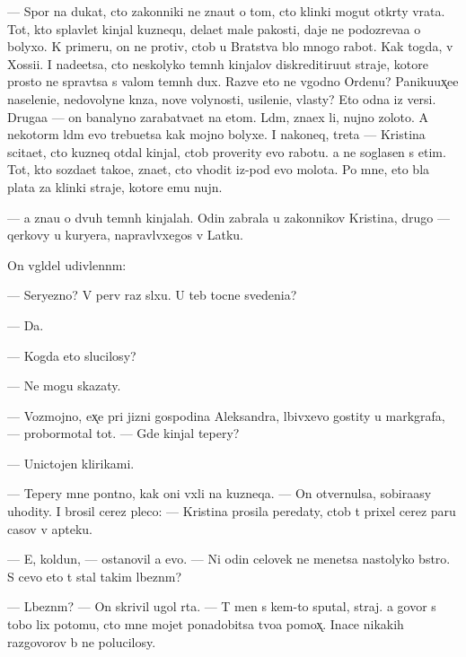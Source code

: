 \documentclass[10pt]{book}
\begin{document}
— Spor{\iu} na dukat, cto zakonniki ne zna{\y}ut o tom, cto klinki mogut otkr{\yi}ty vrata. Tot, kto splavl{\ia}{\y}et kinjal{\yi} kuznequ, dela{\y}et mal{\yi}{\y}e pakosti, daje ne podozreva{\y}a o bolyxo{\y}. K primeru, on ne protiv, ctob{\yi} u Bratstva b{\yi}lo mnogo rabot{\yi}. Kak togda, v Xossi{\y}i. I nade{\y}etsa, cto neskolyko temn{\yi}h kinjalov diskreditiru{\y}ut straje{\y}, kotor{\yi}{\y}e prosto ne sprav{\ia}tsa s valom temn{\yi}h dux. Razve eto ne v{\yi}godno Ordenu? Paniku{\y}ux̨e{\y}e naseleni{\y}e, nedovolyn{\yi}{\y}e kn{\ia}z{\y}a, nov{\yi}{\y}e volynosti, usileni{\y}e, vlasty? Eto odna iz versi{\y}. Druga{\y}a — on banalyno zarabat{\yi}va{\y}et na etom. L{\iu}d{\ia}m, zna{\y}ex li, nujno zoloto. A nekotor{\yi}m l{\iu}d{\ia}m {\y}evo trebu{\y}etsa kak mojno bolyxe. I nakoneq, tret{\y}a — Kristina scita{\y}et, cto kuzneq otdal kinjal, ctob{\yi} proverity {\y}evo rabotu. {\Y}a ne soglasen s etim. Tot, kto sozda{\y}et tako{\y}e, zna{\y}et, cto v{\yi}hodit iz-pod {\y}evo molota. Po mne, eto b{\yi}la plata za klinki straje{\y}, kotor{\yi}{\y}e {\y}emu nujn{\yi}.

— {\Y}a zna{\y}u o dvuh temn{\yi}h kinjalah. Odin zabrala u zakonnikov Kristina, drugo{\y} — qerkovy u kuryera, napravl{\ia}vxegos{\ia} v Latku.

On v{\yi}gl{\ia}del udivlenn{\yi}m:

— Seryezno? V perv{\yi}{\y} raz sl{\yi}xu. U teb{\ia} tocn{\yi}{\y}e svedeni{\y}a?

— Da.

— Kogda eto slucilosy?

— Ne mogu skazaty.

— Vozmojno, {\y}ex̨e pri jizni gospodina Aleksandra, l{\iu}bivxevo gostity u markgrafa, — probormotal tot. — Gde kinjal tepery?

— Unictojen klirikami.

— Tepery mne pon{\ia}tno, kak oni v{\yi}xli na kuzneqa. — On otvernulsa, sobira{\y}asy uhodity. I brosil cerez pleco: — Kristina prosila peredaty, ctob{\yi} t{\yi} prixel cerez paru casov v apteku.

— E{\y}, koldun, — ostanovil {\y}a {\y}evo. — Ni odin celovek ne men{\ia}{\y}etsa nastolyko b{\yi}stro. S cevo eto t{\yi} stal takim l{\iu}bezn{\yi}m?

— L{\iu}bezn{\yi}m? — On skrivil ugol rta. — T{\yi} men{\ia} s kem-to sputal, straj. {\Y}a govor{\iu} s tobo{\y} lix potomu, cto mne mojet ponadobitsa tvo{\y}a pomox̨. Inace nikakih razgovorov b{\yi} ne polucilosy.
\end{document}
